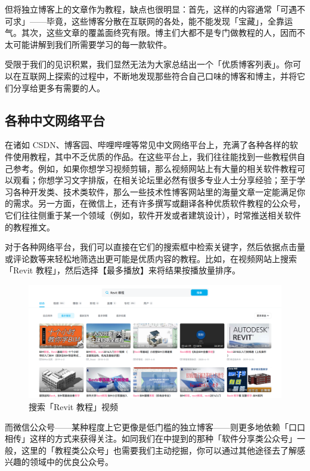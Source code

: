 但将独立博客上的文章作为教程，缺点也很明显：首先，这样的内容通常「可遇不可求」——毕竟，这些博客分散在互联网的各处，能不能发现「宝藏」，全靠运气。其次，这些文章的覆盖面终究有限。博主们大都不是专门做教程的人，因而不太可能讲解到我们所需要学习的每一款软件。

受限于我们的见识积累，我们显然无法为大家总结出一个「优质博客列表」。你可以在互联网上探索的过程中，不断地发现那些符合自己口味的博客和博主，并将它们分享给更多有需要的人。

\subsection{各种中文网络平台}

在诸如 CSDN、博客园、哔哩哔哩等常见中文网络平台上，充满了各种各样的软件使用教程，其中不乏优质的作品。在这些平台上，我们往往能找到一些教程供自己参考。例如，如果你想学习视频剪辑，那么视频网站上有大量的相关软件教程可以观看；你想学习文字排版，在相关论坛里必然有很多专业人士分享经验；至于学习各种开发类、技术类软件，那么一些技术性博客网站里的海量文章一定能满足你的需求。另一方面，在微信上，还有许多撰写或翻译各种优质软件教程的公众号，它们往往侧重于某一个领域（例如，软件开发或者建筑设计），时常推送相关软件的教程推文。

对于各种网络平台，我们可以直接在它们的搜索框中检索关键字，然后依据点击量或评论数等来轻松地筛选出更可能是优质内容的教程。比如，在视频网站上搜索「Revit 教程」，然后选择【最多播放】来将结果按播放量排序。

\begin{figure}[htb!]
  \centering
  \includegraphics[width=.8\textwidth]{assets/software/Searching_Revit_tutorials_on_bilibili.png}
  \caption{搜索「Revit 教程」视频}
  \label{fig:Searching_Revit_tutorials_on_bilibili}
\end{figure}

而微信公众号——某种程度上它更像是低门槛的独立博客——则更多地依赖「口口相传」这样的方式来获得关注。如同我们在中提到的那种「软件分享类公众号」一般，这里的「教程类公众号」也需要我们主动挖掘，你可以通过其他途径去了解感兴趣的领域中的优良公众号。

